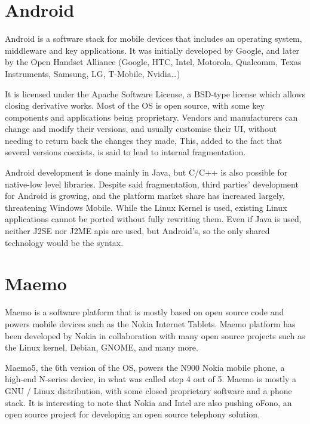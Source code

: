 \documentclass[12pt]{article}
\begin{document}
\section{Android}

Android is a software stack for mobile devices that includes an operating system, middleware and key applications\cite{android:whatis}. It was initially developed by Google, and later by the Open Handset Alliance (Google, HTC, Intel, Motorola, Qualcomm, Texas Instruments, Samsung, LG, T-Mobile, Nvidia\dots)\cite{android:members} 

It is licensed under the Apache Software License, a BSD-type license which allows closing derivative works\cite{android:license}. Most of the OS is open source, with some key components and applications being proprietary. Vendors and manufacturers can change and modify their versions, and usually customise their UI, without needing to return back the changes they made, This, added to the fact that several versions coexists\cite{android:fragmentation}, is said to lead to internal fragmentation. 

Android development is done mainly in Java, but C/C++ is also possible for native-low level libraries\cite{android:developing}. Despite said fragmentation, third parties' development for Android is growing, and the platform market share has increased largely, threatening Windows Mobile\cite{android:share}. While the Linux Kernel is used, existing Linux applications cannot be ported without fully rewriting them. Even if Java is used, neither J2SE nor J2ME apis are used, but Android's, so the only shared technology would be the syntax.\cite{android:java}

\section{Maemo}

Maemo is a software platform that is mostly based on open source code and powers mobile devices such as the Nokia Internet Tablets. Maemo platform has been developed by Nokia in collaboration with many open source projects such as the Linux kernel, Debian, GNOME, and many more\cite{maemo:about}.

Maemo5, the 6th version of the OS, powers the N900 Nokia mobile phone, a high-end N-series device, in what was called step 4 out of 5\cite{maemo:roadmap}. Maemo is mostly a GNU / Linux distribution, with some closed proprietary software and a phone stack. It is interesting to note that Nokia and Intel are also pushing oFono\cite{ofono:sponsors}, an open source project for developing an open source telephony solution\cite{ofono:about}.
\end{document}
